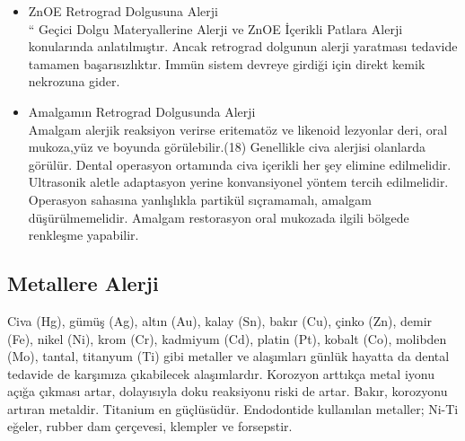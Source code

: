 \begin{itemize}
   \item ZnOE Retrograd Dolgusuna Alerji \\
   “ Geçici Dolgu Materyallerine Alerji ve ZnOE İçerikli Patlara Alerji konularında anlatılmıştır. Ancak retrograd dolgunun alerji yaratması tedavide tamamen  başarısızlıktır. Immün sistem devreye girdiği için direkt kemik nekrozuna gider.  
   
   \item Amalgamın Retrograd Dolgusunda Alerji\\
   Amalgam alerjik reaksiyon verirse eritematöz ve likenoid lezyonlar  deri, oral mukoza,yüz ve boyunda görülebilir.(18) Genellikle civa alerjisi olanlarda görülür. Dental operasyon ortamında civa içerikli her şey elimine edilmelidir. Ultrasonik aletle adaptasyon yerine konvansiyonel yöntem tercih edilmelidir. Operasyon sahasına yanlışlıkla partikül sıçramamalı, amalgam düşürülmemelidir. Amalgam restorasyon oral mukozada ilgili bölgede renkleşme yapabilir.
 
\end{itemize}



\subsection{Metallere Alerji}
Civa (Hg), gümüş (Ag), altın (Au), kalay (Sn), bakır (Cu), çinko (Zn), demir (Fe), nikel (Ni), krom (Cr), kadmiyum (Cd), platin (Pt), kobalt (Co), molibden (Mo), tantal, titanyum (Ti) gibi metaller ve alaşımları günlük hayatta da dental tedavide de karşımıza çıkabilecek alaşımlardır. Korozyon arttıkça metal iyonu açığa çıkması artar, dolayısıyla doku reaksiyonu riski de artar. Bakır, korozyonu artıran metaldir. Titanium en güçlüsüdür.
Endodontide kullanılan metaller; Ni-Ti eğeler, rubber dam çerçevesi, klempler ve forsepstir. 

